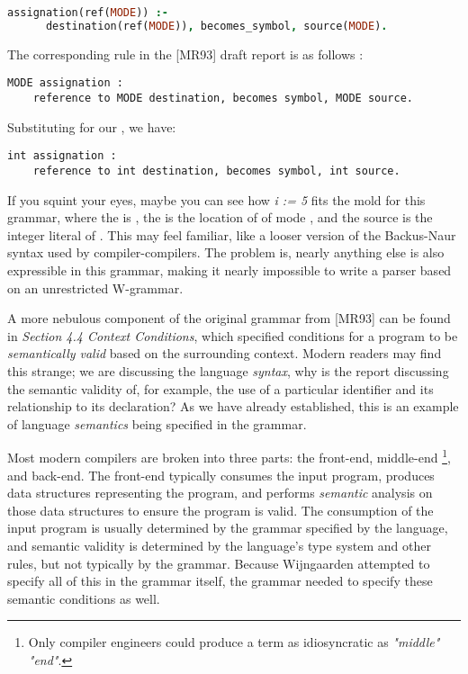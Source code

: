\begin{lstlisting}[language=prolog,frame=single]
assignation(ref(MODE)) :-
      destination(ref(MODE)), becomes_symbol, source(MODE).
\end{lstlisting}

The corresponding rule in the [MR93] draft report is as follows
\cite{draft_report_algol_1968}:
\begin{lstlisting}[frame=single]
MODE assignation :
    reference to MODE destination, becomes symbol, MODE source.
\end{lstlisting}

Substituting  for our , we have:
\begin{lstlisting}[frame=single]
int assignation :
    reference to int destination, becomes symbol, int source.
\end{lstlisting}

If you squint your eyes, maybe you can see how \textit{i := 5} fits the mold for this
grammar, where the  is , the  is
the location of  of mode , and the source is
the integer literal  of .
This may feel familiar, like a looser version of the Backus-Naur
syntax used by compiler-compilers.
The problem is, nearly anything else is also expressible in this grammar,
making it nearly impossible to write a parser based on an unrestricted W-grammar.

A more nebulous component of the original grammar from [MR93] can be found in
\textit{Section 4.4 Context Conditions},
which specified conditions for a program to be \textit{semantically valid}
based on the surrounding context.
Modern readers may find this strange; we are discussing the language \textit{syntax},
why is the report discussing the semantic validity of, for example,
the use of a particular identifier and its relationship to its declaration?
As we have already established, this is an example of language \textit{semantics}
being specified in the grammar.

Most modern compilers are broken into three parts: the front-end, middle-end
\footnote{Only compiler engineers could produce a term as idiosyncratic as \textit{"middle" "end"}.},
and back-end.
The front-end typically consumes the input program,
produces data structures representing the program,
and performs \textit{semantic} analysis on those data structures to ensure the program is valid.
The consumption of the input program is usually determined by the grammar specified by the language,
and semantic validity is determined by the language's type system and other rules,
but not typically by the grammar.
Because Wijngaarden attempted to specify all of this in the grammar itself,
the grammar needed to specify these semantic conditions as well.

